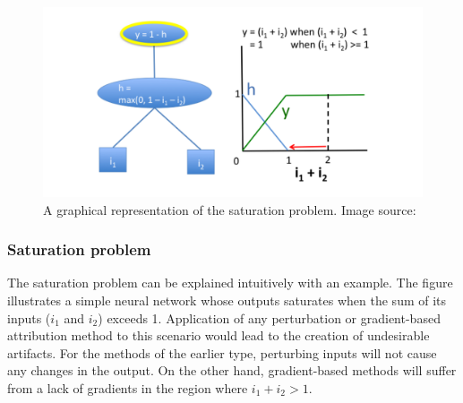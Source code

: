 \documentclass[../report.tex]{subfiles}
\begin{document}
 \begin{figure}[h]
 	\includegraphics[width=\textwidth]{images/chapter3/deep_lift.png}
 	\caption[A graphical representation of the saturation problem]{A graphical representation of the saturation problem. Image source: \cite{shrikumar2017learning}}
 	\label{fig_deep_lift}
 \end{figure}
 \subsubsection{Saturation problem}\label{sec_saturation}
 The saturation problem can be explained intuitively with an example. The figure illustrates a simple neural network whose outputs saturates when the sum of its inputs ($i_1$ and $i_2$) exceeds 1. Application of any perturbation or gradient-based attribution method to this scenario would lead to the creation of undesirable artifacts. For the methods of the earlier type, perturbing inputs will not cause any changes in the output. On the other hand, gradient-based methods will suffer from a lack of gradients in the region where $i_1+i_2 > 1$.
\end{document}
